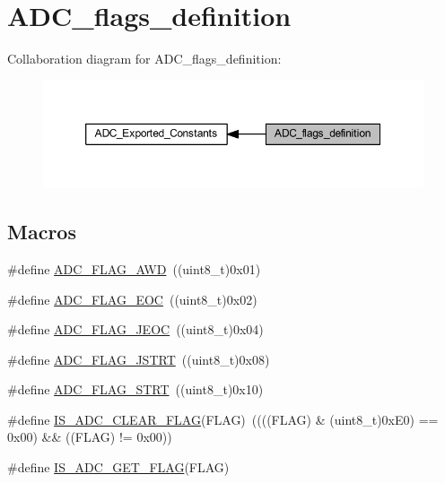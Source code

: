 \hypertarget{group___a_d_c__flags__definition}{}\section{A\+D\+C\+\_\+flags\+\_\+definition}
\label{group___a_d_c__flags__definition}
Collaboration diagram for A\+D\+C\+\_\+flags\+\_\+definition\+:
\nopagebreak
\begin{figure}[H]
\begin{center}
\leavevmode
\includegraphics[width=350pt]{group___a_d_c__flags__definition}
\end{center}
\end{figure}
\subsection*{Macros}
\begin{DoxyCompactItemize}
\item 
\#define \hyperlink{group___a_d_c__flags__definition_gadb75a4b430fb84950232b7a8f3a6a877}{A\+D\+C\+\_\+\+F\+L\+A\+G\+\_\+\+A\+WD}~((uint8\+\_\+t)0x01)
\item 
\#define \hyperlink{group___a_d_c__flags__definition_gaf2c6fdf7e9ab63b778149e5fb56413d4}{A\+D\+C\+\_\+\+F\+L\+A\+G\+\_\+\+E\+OC}~((uint8\+\_\+t)0x02)
\item 
\#define \hyperlink{group___a_d_c__flags__definition_ga4df8eea8ab83d98104ee15a339743a4e}{A\+D\+C\+\_\+\+F\+L\+A\+G\+\_\+\+J\+E\+OC}~((uint8\+\_\+t)0x04)
\item 
\#define \hyperlink{group___a_d_c__flags__definition_ga278f4e866f4322c1120bf0db5301c432}{A\+D\+C\+\_\+\+F\+L\+A\+G\+\_\+\+J\+S\+T\+RT}~((uint8\+\_\+t)0x08)
\item 
\#define \hyperlink{group___a_d_c__flags__definition_gad0c59ae7749c69b5b91f2c533db1b619}{A\+D\+C\+\_\+\+F\+L\+A\+G\+\_\+\+S\+T\+RT}~((uint8\+\_\+t)0x10)
\item 
\#define \hyperlink{group___a_d_c__flags__definition_gac5b6fb60ec921255b05261ec04573470}{I\+S\+\_\+\+A\+D\+C\+\_\+\+C\+L\+E\+A\+R\+\_\+\+F\+L\+AG}(F\+L\+AG)~((((F\+L\+AG) \& (uint8\+\_\+t)0x\+E0) == 0x00) \&\& ((\+F\+L\+A\+G) != 0x00))
\item 
\#define \hyperlink{group___a_d_c__flags__definition_ga597eb68dfef9dbe0928ed14a1aedc710}{I\+S\+\_\+\+A\+D\+C\+\_\+\+G\+E\+T\+\_\+\+F\+L\+AG}(F\+L\+AG)
\end{DoxyCompactItemize}


